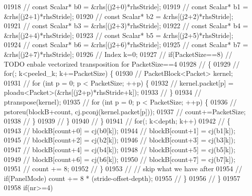 \begin{DoxyCode}
01918 \textcolor{comment}{//       const Scalar* b0 = &rhs[(j2+0)*rhsStride];}
01919 \textcolor{comment}{//       const Scalar* b1 = &rhs[(j2+1)*rhsStride];}
01920 \textcolor{comment}{//       const Scalar* b2 = &rhs[(j2+2)*rhsStride];}
01921 \textcolor{comment}{//       const Scalar* b3 = &rhs[(j2+3)*rhsStride];}
01922 \textcolor{comment}{//       const Scalar* b4 = &rhs[(j2+4)*rhsStride];}
01923 \textcolor{comment}{//       const Scalar* b5 = &rhs[(j2+5)*rhsStride];}
01924 \textcolor{comment}{//       const Scalar* b6 = &rhs[(j2+6)*rhsStride];}
01925 \textcolor{comment}{//       const Scalar* b7 = &rhs[(j2+7)*rhsStride];}
01926 \textcolor{comment}{//       Index k=0;}
01927 \textcolor{comment}{//       if(PacketSize==8) // TODO enbale vectorized transposition for PacketSize==4}
01928 \textcolor{comment}{//       \{}
01929 \textcolor{comment}{//         for(; k<peeled\_k; k+=PacketSize) \{}
01930 \textcolor{comment}{//           PacketBlock<Packet> kernel;}
01931 \textcolor{comment}{//           for (int p = 0; p < PacketSize; ++p) \{}
01932 \textcolor{comment}{//             kernel.packet[p] = ploadu<Packet>(&rhs[(j2+p)*rhsStride+k]);}
01933 \textcolor{comment}{//           \}}
01934 \textcolor{comment}{//           ptranspose(kernel);}
01935 \textcolor{comment}{//           for (int p = 0; p < PacketSize; ++p) \{}
01936 \textcolor{comment}{//             pstoreu(blockB+count, cj.pconj(kernel.packet[p]));}
01937 \textcolor{comment}{//             count+=PacketSize;}
01938 \textcolor{comment}{//           \}}
01939 \textcolor{comment}{//         \}}
01940 \textcolor{comment}{//       \}}
01941 \textcolor{comment}{//       for(; k<depth; k++)}
01942 \textcolor{comment}{//       \{}
01943 \textcolor{comment}{//         blockB[count+0] = cj(b0[k]);}
01944 \textcolor{comment}{//         blockB[count+1] = cj(b1[k]);}
01945 \textcolor{comment}{//         blockB[count+2] = cj(b2[k]);}
01946 \textcolor{comment}{//         blockB[count+3] = cj(b3[k]);}
01947 \textcolor{comment}{//         blockB[count+4] = cj(b4[k]);}
01948 \textcolor{comment}{//         blockB[count+5] = cj(b5[k]);}
01949 \textcolor{comment}{//         blockB[count+6] = cj(b6[k]);}
01950 \textcolor{comment}{//         blockB[count+7] = cj(b7[k]);}
01951 \textcolor{comment}{//         count += 8;}
01952 \textcolor{comment}{//       \}}
01953 \textcolor{comment}{//       // skip what we have after}
01954 \textcolor{comment}{//       if(PanelMode) count += 8 * (stride-offset-depth);}
01955 \textcolor{comment}{//     \}}
01956 \textcolor{comment}{//   \}}
01957 
01958   \textcolor{keywordflow}{if}(nr>=4)

\end{DoxyCode}
